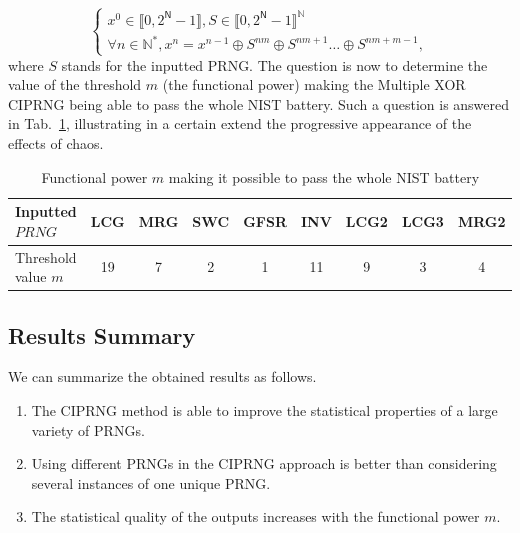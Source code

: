 \begin{equation}
\left\{
\begin{array}{l}
x^0 \in \llbracket 0, 2^\mathsf{N}-1 \rrbracket, S \in \llbracket 0, 2^\mathsf{N}-1 \rrbracket^\mathds{N} \\
\forall n \in \mathds{N}^*, x^n = x^{n-1} \oplus S^{nm}\oplus S^{nm+1}\ldots \oplus S^{nm+m-1} ,
\end{array}
\right.
\label{equation Oplus}
\end{equation}
where $S$ stands for the inputted PRNG.
The question is now to determine the value of the threshold $m$ (the functional power) making 
the Multiple XOR CIPRNG being able to pass the whole NIST battery.
Such a question is answered in Tab.~\ref{threshold}, illustrating in a certain 
extend the progressive appearance of the effects of chaos.


\begin{table}
\renewcommand{\arraystretch}{1.3}
\caption{Functional power $m$ making it possible to pass the whole NIST battery}
\label{threshold}
\centering
  \begin{tabular}{|l||c|c|c|c|c|c|c|c|}
    \hline
Inputted $PRNG$ & LCG & MRG & SWC & GFSR & INV& LCG2 & LCG3  & MRG2 \\ \hline\hline
Threshold  value $m$& 19 & 7  & 2& 1 & 11& 9& 3& 4\\ \hline\hline
\end{tabular}
\end{table}

\subsection{Results Summary}

We can summarize the obtained results as follows.
\begin{enumerate}
\item The CIPRNG method is able to improve the statistical properties of a large variety of PRNGs.
\item Using different PRNGs in the CIPRNG approach is better than considering several instances of one unique PRNG.
\item The statistical quality of the outputs increases with the functional power $m$.
\end{enumerate}

